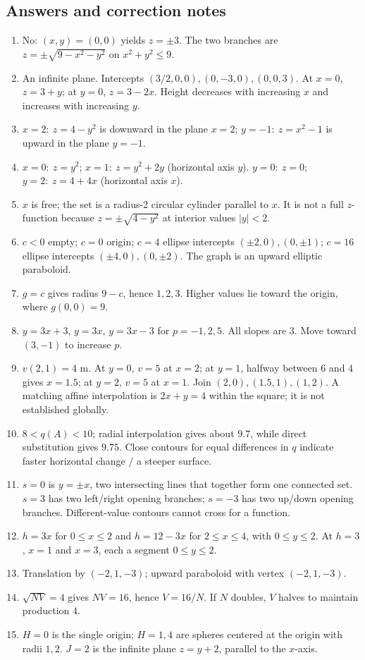\subsection*{Answers and correction notes}
\begin{enumerate}[label=\textbf{A\arabic*.},leftmargin=*]
\item No: $(x,y)=(0,0)$ yields $z=\pm3$. The two branches are $z=\pm\sqrt{9-x^2-y^2}$ on $x^2+y^2\leq9$.
\item An infinite plane. Intercepts $(3/2,0,0),(0,-3,0),(0,0,3)$. At $x=0$, $z=3+y$; at $y=0$, $z=3-2x$. Height decreases with increasing $x$ and increases with increasing $y$.
\item $x=2:\ z=4-y^2$ is downward in the plane $x=2$; $y=-1:\ z=x^2-1$ is upward in the plane $y=-1$.
\item $x=0:\ z=y^2$; $x=1:\ z=y^2+2y$ (horizontal axis $y$). $y=0:\ z=0$; $y=2:\ z=4+4x$ (horizontal axis $x$).
\item $x$ is free; the set is a radius-2 circular cylinder parallel to $x$. It is not a full $z$-function because $z=\pm\sqrt{4-y^2}$ at interior values $|y|<2$.
\item $c<0$ empty; $c=0$ origin; $c=4$ ellipse intercepts $(\pm2,0),(0,\pm1)$; $c=16$ ellipse intercepts $(\pm4,0),(0,\pm2)$. The graph is an upward elliptic paraboloid.
\item $g=c$ gives radius $9-c$, hence $1,2,3$. Higher values lie toward the origin, where $g(0,0)=9$.
\item $y=3x+3$, $y=3x$, $y=3x-3$ for $p=-1,2,5$. All slopes are $3$. Move toward $(3,-1)$ to increase $p$.
\item $v(2,1)=4$ m. At $y=0$, $v=5$ at $x=2$; at $y=1$, halfway between $6$ and $4$ gives $x=1.5$; at $y=2$, $v=5$ at $x=1$. Join $(2,0),(1.5,1),(1,2)$. A matching affine interpolation is $2x+y=4$ within the square; it is not established globally.
\item $8<q(A)<10$; radial interpolation gives about $9.7$, while direct substitution gives $9.75$. Close contours for equal differences in $q$ indicate faster horizontal change / a steeper surface.
\item $s=0$ is $y=\pm x$, two intersecting lines that together form one connected set. $s=3$ has two left/right opening branches; $s=-3$ has two up/down opening branches. Different-value contours cannot cross for a function.
\item $h=3x$ for $0\leq x\leq2$ and $h=12-3x$ for $2\leq x\leq4$, with $0\leq y\leq2$. At $h=3$, $x=1$ and $x=3$, each a segment $0\leq y\leq2$.
\item Translation by $(-2,1,-3)$; upward paraboloid with vertex $(-2,1,-3)$.
\item $\sqrt{NV}=4$ gives $NV=16$, hence $V=16/N$. If $N$ doubles, $V$ halves to maintain production $4$.
\item $H=0$ is the single origin; $H=1,4$ are spheres centered at the origin with radii $1,2$. $J=2$ is the infinite plane $z=y+2$, parallel to the $x$-axis.
\end{enumerate}
